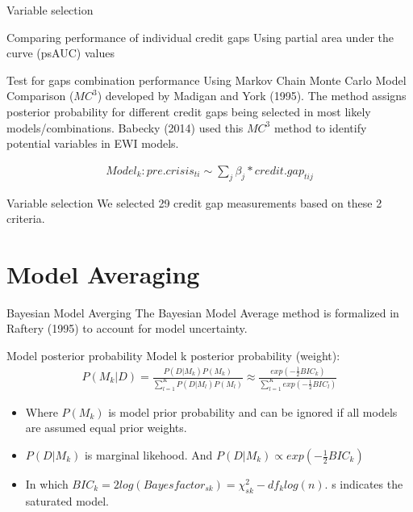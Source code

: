 \documentclass[
  ignorenonframetext,
]{beamer}
\begin{document}
\begin{frame}{Variable selection}
\protect\hypertarget{variable-selection}{}
\begin{block}{Comparing performance of individual credit gaps}
\protect\hypertarget{comparing-performance-of-individual-credit-gaps}{}
Using partial area under the curve (psAUC) values
\end{block}

\begin{block}{Test for gaps combination performance}
\protect\hypertarget{test-for-gaps-combination-performance}{}
Using Markov Chain Monte Carlo Model Comparison (\(MC^3\)) developed by
Madigan and York (1995). The method assigns posterior probability for
different credit gaps being selected in most likely models/combinations.
Babecky (2014) used this \(MC^3\) method to identify potential variables
in EWI models.

\begin{align*}
Model_k :  pre.crisis_{ti} \sim \sum\nolimits_j \beta_j * credit.gap_{tij}
\end{align*}
\end{block}

\begin{block}{Variable selection}
\protect\hypertarget{variable-selection-1}{}
We selected 29 credit gap measurements based on these 2 criteria.
\end{block}
\end{frame}

\hypertarget{model-averaging}{%
\section{Model Averaging}\label{model-averaging}}

\begin{frame}{Bayesian Model Averging}
\protect\hypertarget{bayesian-model-averging}{}
The Bayesian Model Average method is formalized in Raftery (1995) to
account for model uncertainty.

\begin{block}{Model posterior probability}
\protect\hypertarget{model-posterior-probability}{}
Model k posterior probability (weight): \begin{align}
  P(M_k|D) = \frac{P(D|M_k)P(M_k)}{\sum\nolimits_{l=1}^K P(D|M_l)P(M_l)} 
  \approx \frac{exp(-\frac{1}{2}BIC_k)}{\sum\nolimits_{l=1}^K exp(-\frac{1}{2}BIC_l)}
\end{align}

\begin{itemize}
\item
  Where \(P(M_k)\) is model prior probability and can be ignored if all
  models are assumed equal prior weights.
\item
  \(P(D|M_k)\) is marginal likehood. And
  \(P(D|M_k) \propto exp(-\frac{1}{2}BIC_k)\)
\item
  In which
  \(BIC_k = 2log (Bayesfactor_{sk}) = \chi^2_{sk} - df_klog(n)\). s
  indicates the saturated model.
\end{itemize}
\end{block}
\end{frame}
\end{document}
